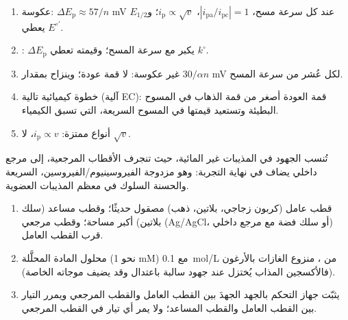 \begin{method}\label{met:b3:electrode-kinetics:cv-diagnosis}
\begin{enumerate}
  \item عكوسة: $\Delta E_{\mathrm p} \approx 57/n$ mV عند كل سرعة مسح، $|i_{\mathrm{pa}}/i_{\mathrm{pc}}| = 1$، $i_{\mathrm p} \propto \sqrt v$؛
        و$E_{1/2}$ يعطي $E^{\circ\prime}$.
  \item {}: $\Delta E_{\mathrm p}$ يكبر مع سرعة المسح؛ وقيمته تعطي $k^\circ$.
  \item غير عكوسة: لا قمة عودة؛ وينزاح  بمقدار $30/\alpha n$ mV لكل
        عُشر من سرعة المسح.
  \item خطوة كيميائية تالية (آلية EC): قمة العودة أصغر من
        قمة الذهاب في المسوح البطيئة وتستعيد قيمتها في المسوح السريعة، التي تسبق
        الكيمياء.
  \item أنواع ممتزة: $i_{\mathrm p} \propto v$، لا $\sqrt v$.
\end{enumerate}
\end{method}

تُنسب الجهود في المذيبات غير المائية، حيث تنجرف الأقطاب المرجعية،
إلى مرجع داخلي يضاف في نهاية التجربة: وهو
مزدوجة الفيروسينيوم/الفيروسين، السريعة والحسنة السلوك في معظم المذيبات العضوية.

\begin{method}\label{met:b3:electrode-kinetics:three-electrode}
\begin{enumerate}
  \item قطب عامل (كربون زجاجي، بلاتين، ذهب) مصقول حديثًا؛
        وقطب مساعد (سلك بلاتين) أكبر مساحة؛ وقطب مرجعي
        (Ag/AgCl، أو سلك فضة مع مرجع داخلي) قرب القطب
        العامل.
  \item محلول المادة المحلَّلة (نحو 1 mM) مع \qty{0.1}{mol/L} من ، منزوع الغازات بالأرغون (فالأكسجين المذاب يُختزل عند
        جهود سالبة باعتدال وقد يضيف موجاته الخاصة).
  \item يثبّت جهاز التحكم بالجهد الجهدَ بين القطب العامل والقطب المرجعي
        ويمرر التيار بين القطب العامل والقطب
        المساعد؛ ولا يمر أي تيار في القطب المرجعي.
\end{enumerate}
\end{method}

